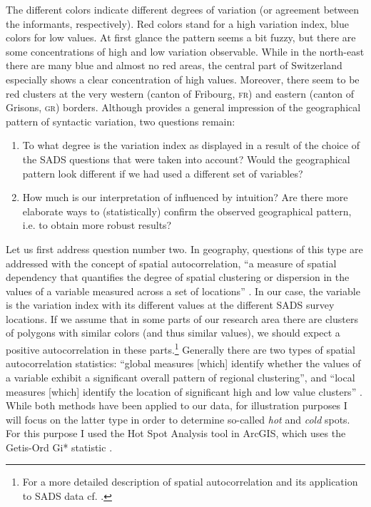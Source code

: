 \documentclass[output=paper]{LSP/langsci}
\begin{document}
The different colors indicate different degrees of variation (or agreement between the informants, respectively). Red colors stand for a high variation index, blue colors for low values. At first glance the pattern seems a bit fuzzy, but there are some concentrations of high and low variation observable. While in the north-east there are many blue and almost no red areas, the central part of Switzerland especially shows a clear concentration of high values. Moreover, there seem to be red clusters at the very western (canton of Fribourg, \textsc{fr}) and eastern (canton of Grisons, \textsc{gr}) borders. Although  provides a general impression of the geographical pattern of syntactic variation, two questions remain:

\begin{enumerate}
\item To what degree is the variation index as displayed in  a result of the choice of the SADS questions that were taken into account? Would the geographical pattern look different if we had used a different set of variables?
\item How much is our interpretation of  influenced by intuition? Are there more elaborate ways to (statistically) confirm the observed geographical pattern, i.e. to obtain more robust results?
\end{enumerate}

Let us first address question number two. In geography, questions of this type are addressed with the concept of spatial autocorrelation, “a measure of spatial dependency that quantifies the degree of spatial clustering or dispersion in the values of a variable measured across a set of locations” \citep[34]{grieve_use_2011}. In our case, the variable is the variation index with its different values at the different SADS survey locations. If we assume that in some parts of our research area there are clusters of polygons with similar colors (and thus similar values), we should expect a positive autocorrelation in these parts.\footnote{For a more detailed description of spatial autocorrelation and its application to SADS data cf. \citet[62--63]{sibler_visualisierung_2011}.} Generally there are two types of spatial autocorrelation statistics: “global measures [which] identify whether the values of a variable exhibit a significant overall pattern of regional clustering”, and “local measures [which] identify the location of significant high and low value clusters” \citep[34]{grieve_use_2011}. While both methods have been applied to our data, for illustration purposes I will focus on the latter type in order to determine so-called \emph{hot} and \emph{cold} spots. For this purpose I used the Hot Spot Analysis tool in ArcGIS, which uses the Getis-Ord Gi* statistic \citep{getis_analysis_1992}.
\end{document}
